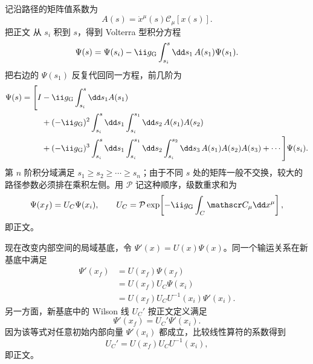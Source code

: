 \begin{derivation}
记沿路径的矩阵值系数为
\begin{equation*}
 A(s)=\dot x^\mu(s)\mathscr C_\mu[x(s)].
\end{equation*}
把正文 从 $s_i$ 积到 $s$，得到 Volterra 型积分方程
\begin{equation*}
 \Psi(s)=\Psi(s_i)-\ii g_{\rm G}\int_{s_i}^{s}\dd s_1\,A(s_1)\Psi(s_1).
\end{equation*}
把右边的 $\Psi(s_1)$ 反复代回同一方程，前几阶为
\begin{align*}
 \Psi(s)=\Bigg[I
 &-\ii g_{\rm G}\int_{s_i}^{s}\dd s_1A(s_1)\\
 &+(-\ii g_{\rm G})^2
 \int_{s_i}^{s}\dd s_1\int_{s_i}^{s_1}\dd s_2\,
 A(s_1)A(s_2)\\
 &+(-\ii g_{\rm G})^3
 \int_{s_i}^{s}\dd s_1\int_{s_i}^{s_1}\dd s_2
 \int_{s_i}^{s_2}\dd s_3\,
 A(s_1)A(s_2)A(s_3)+\cdots\Bigg]\Psi(s_i).
\end{align*}
第 $n$ 阶积分域满足 $s_1\ge s_2\ge\cdots\ge s_n$；由于不同 $s$ 处的矩阵一般不交换，较大的路径参数必须排在乘积左侧。用 $\mathcal P$ 记这种顺序，级数重求和为
\begin{equation*}
 \Psi(x_f)=U_C\Psi(x_i),\qquad
 U_C=\mathcal P\exp\!\left[-\ii g_{\rm G}\int_C\mathscr C_\mu\dd x^\mu\right],
\end{equation*}
即正文。

现在改变内部空间的局域基底，令 $\Psi'(x)=U(x)\Psi(x)$。同一个输运关系在新基底中满足
\begin{align*}
 \Psi'(x_f)
 &=U(x_f)\Psi(x_f)\\
 &=U(x_f)U_C\Psi(x_i)\\
 &=U(x_f)U_CU^{-1}(x_i)\Psi'(x_i).
\end{align*}
另一方面，新基底中的 Wilson 线 $U_C'$ 按正文定义满足
\begin{equation*}
 \Psi'(x_f)=U_C'\Psi'(x_i).
\end{equation*}
因为该等式对任意初始内部向量 $\Psi'(x_i)$ 都成立，比较线性算符的系数得到
\begin{equation*}
 U_C'=U(x_f)U_CU^{-1}(x_i),
\end{equation*}
即正文。
\end{derivation}

